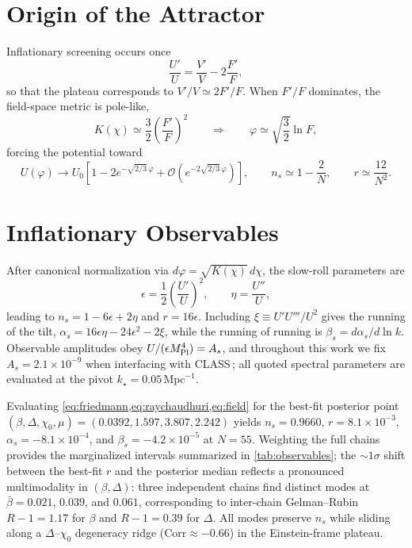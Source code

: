 \documentclass[11pt,a4paper]{article}
\begin{document}
\section{Origin of the Attractor}
\label{sec:origin}
Inflationary screening occurs once
\begin{equation}
\frac{U'}{U}=\frac{V'}{V}-2\frac{F'}{F},
\end{equation}
so that the plateau corresponds to $V'/V\simeq2F'/F$. When $F'/F$ dominates, the field-space metric is pole-like,
\begin{equation}
K(\chi)\simeq\frac{3}{2}\left(\frac{F'}{F}\right)^{2}\qquad\Rightarrow\qquad \varphi\simeq\sqrt{\frac{3}{2}}\ln F,
\end{equation}
forcing the potential toward
\begin{equation}
U(\varphi)\rightarrow U_{0}\left[1-2e^{-\sqrt{2/3}\,\varphi}+\mathcal{O}(e^{-2\sqrt{2/3}\,\varphi})\right], \qquad n_{s}\simeq1-\frac{2}{N}, \qquad r\simeq\frac{12}{N^{2}}.
\end{equation}

\section{Inflationary Observables}
\label{sec:observables}
After canonical normalization via $d\varphi=\sqrt{K(\chi)}\,d\chi$, the slow-roll parameters are
\begin{equation}
\epsilon=\frac{1}{2}\left(\frac{U'}{U}\right)^{2}, \qquad \eta=\frac{U''}{U},
\end{equation}
leading to $n_{s}=1-6\epsilon+2\eta$ and $r=16\epsilon$. Including $\xi \equiv U'U'''/U^{2}$ gives the running of the tilt, $\alpha_{s}=16\epsilon\eta-24\epsilon^{2}-2\xi$, while the running of running is $\beta_{s}=d\alpha_{s}/d\ln k$. Observable amplitudes obey $U/(\epsilon M_{\rm Pl}^{4})=A_{s}$, and throughout this work we fix $A_{s}=2.1\times10^{-9}$ when interfacing with \textsc{CLASS}$\,$; all quoted spectral parameters are evaluated at the pivot $k_{\star}=0.05\,\mathrm{Mpc}^{-1}$.

Evaluating \cref{eq:friedmann,eq:raychaudhuri,eq:field} for the best-fit posterior point $(\beta,\Delta,\chi_{0},\mu)=(0.0392,1.597,3.807,2.242)$ yields $n_s=0.9660$, $r=8.1\times10^{-3}$, $\alpha_s=-8.1\times10^{-4}$, and $\beta_s=-4.2\times10^{-5}$ at $N=55$. Weighting the full chains provides the marginalized intervals summarized in \cref{tab:observables}; the ${\sim}1\sigma$ shift between the best-fit $r$ and the posterior median reflects a pronounced multimodality in $(\beta,\Delta)$: three independent chains find distinct modes at $\bar\beta=0.021$, $0.039$, and $0.061$, corresponding to inter-chain Gelman--Rubin $R{-}1=1.17$ for $\beta$ and $R{-}1=0.39$ for $\Delta$. All modes preserve $n_s$ while sliding along a $\Delta$--$\chi_0$ degeneracy ridge ($\mathrm{Corr}\approx-0.66$) in the Einstein-frame plateau.
\end{document}
